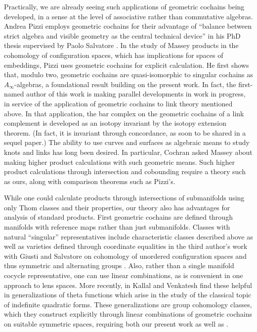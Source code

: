 Practically, we are already seeing such applications of geometric cochains being developed, in a sense at the level of associative rather than commutative algebras.
Andrea Pizzi employs geometric cochains for their advantage of ``balance between strict algebra and visible geometry as the central technical device'' in his PhD thesis supervised by Paolo Salvatore \cite{Pizzi26}.
In the study of Massey products in the cohomology of configuration spaces, which has implications for spaces of embeddings, Pizzi uses geometric cochains for explicit calculation.
He first shows that, modulo two, geometric cochains are quasi-isomorphic to singular cochains as $A_\infty$-algebras, a foundational result building on the present work.
In fact, the first-named author of this work is making parallel developments in work in progress, in service of the application of geometric cochains to link theory \cite{FGKSW} mentioned above.
In that application, the bar complex on the geometric cochains of a link complement is developed as an isotopy invariant by the isotopy extension theorem.
(In fact, it is invariant through concordance, as soon to be shared in a sequel paper.)
The ability to use curves and surfaces as algebraic means to study knots and links has long been desired.
In particular, Cochran \cite{cochran1990milnor} asked Massey about making higher product calculations with such geometric means.
Such higher product calculations through intersection and cobounding require a theory such as ours, along with comparison theorems such as Pizzi's.

While one could calculate products through intersections of submanifolds using only Thom classes and their properties, our theory also has advantages for analysis of standard products.
First geometric cochains are defined through manifolds with reference maps rather than just submanifolds.
Classes with natural ``singular'' representatives include characteristic classes described above as well as varieties defined through coordinate equalities in the third author's work with Giusti and Salvatore on cohomology of unordered configuration spaces and thus symmetric and alternating groups \cite{giusti2012symmetric, giusti2021alternating}.
Also, rather than a single manifold cocycle representative, one can use linear combinations, as is convenient in one approach to lens spaces.
More recently, in \cite{KV26} Kallal and Venkatesh find these helpful in generalizations of theta functions which arise in the study of the classical topic of indefinite quadratic forms.
These generalizations are group cohomology classes, which they construct explicitly through linear combinations of geometric cochains on suitable symmetric spaces, requiring both our present work as well as \cite{FMS-transversesingular}.

